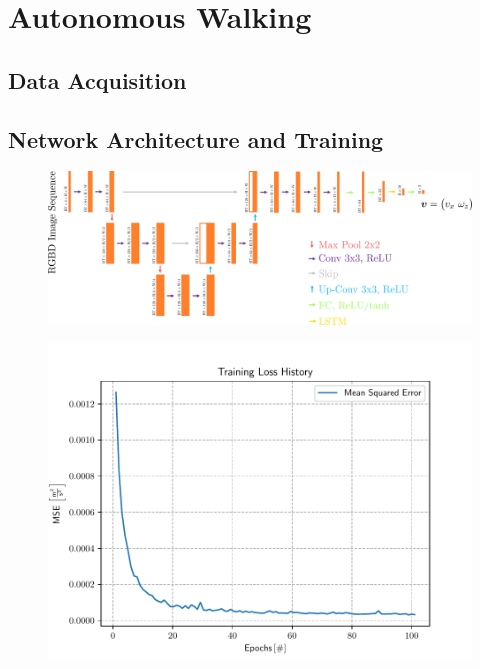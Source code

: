 \section{Autonomous Walking}
\label{sec::54_aw}
\subsection{Data Acquisition}
\subsection{Network Architecture and Training}
\begin{figure}[h]
	\centering
	\includegraphics[scale=.35]{chapters/05_experiments/04_autonomous_walking/unet.png}
	\caption{}
	\label{fig::542_unet}
\end{figure}
\begin{figure}[h]
	\centering
	\includegraphics[scale=.6]{chapters/05_experiments/04_autonomous_walking/05_07_19_loss_history.pdf}
	\caption{}
	\label{fig::542_loss}
\end{figure}
